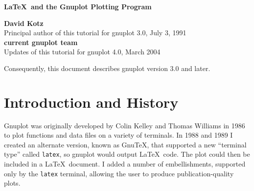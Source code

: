 %
%
%
%
%







\begin{titlepage}

\begin{center}
{\Large \bf \LaTeX\ and the Gnuplot Plotting Program}

\vskip2cm

{\bf David Kotz} \\[0.4cm]
Principal author of this tutorial for gnuplot 3.0, July 3, 1991 \\[1.0cm]

{\bf current gnuplot team} \\[0.4cm]
Updates of this tutorial for gnuplot 4.0, March 2004

\vskip2cm

Consequently, this document describes gnuplot version 3.0 and later.


\end{center}

\vfil
\vfil
\tableofcontents
\vfil

\end{titlepage}


\pagestyle{myheadings}

\currentspace %

\section{Introduction and History}

Gnuplot was originally developed by Colin Kelley and Thomas Williams
in 1986 to plot functions and data files on a variety of terminals.
In 1988 and 1989 I created an alternate version, known as Gnu\TeX,
that supported a new ``terminal type'' called {\tt latex}, so gnuplot
would output \LaTeX\ code. The plot could then be included in a
\LaTeX\ document. I added a number of embellishments, supported only
by the {\tt latex} terminal, allowing the user to produce
publication-quality plots.

